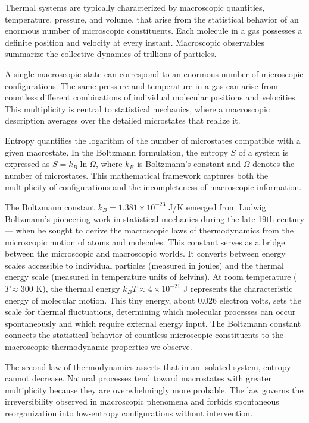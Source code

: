 Thermal systems are typically characterized by macroscopic quantities, temperature, pressure, and volume, that arise from the statistical behavior of an enormous number of microscopic constituents. Each molecule in a gas possesses a definite position and velocity at every instant. Macroscopic observables summarize the collective dynamics of trillions of particles.

A single macroscopic state can correspond to an enormous number of microscopic configurations. The same pressure and temperature in a gas can arise from countless different combinations of individual molecular positions and velocities. This multiplicity is central to statistical mechanics, where a macroscopic description averages over the detailed microstates that realize it.

Entropy quantifies the logarithm of the number of microstates compatible with a given macrostate. In the Boltzmann formulation, the entropy $S$ of a system is expressed as $S = k_B \ln \Omega$, where $k_B$ is Boltzmann's constant and $\Omega$ denotes the number of microstates. This mathematical framework captures both the multiplicity of configurations and the incompleteness of macroscopic information.

The Boltzmann constant $k_B = 1.381 \times 10^{-23}$ J/K emerged from Ludwig Boltzmann's pioneering work in statistical mechanics during the late 19th century — when he sought to derive the macroscopic laws of thermodynamics from the microscopic motion of atoms and molecules. This constant serves as a bridge between the microscopic and macroscopic worlds. It converts between energy scales accessible to individual particles (measured in joules) and the thermal energy scale (measured in temperature units of kelvins). At room temperature ($T \approx 300$ K), the thermal energy $k_B T \approx 4 \times 10^{-21}$ J represents the characteristic energy of molecular motion. This tiny energy, about $0.026$ electron volts, sets the scale for thermal fluctuations, determining which molecular processes can occur spontaneously and which require external energy input. The Boltzmann constant connects the statistical behavior of countless microscopic constituents to the macroscopic thermodynamic properties we observe.

The second law of thermodynamics asserts that in an isolated system, entropy cannot decrease. Natural processes tend toward macrostates with greater multiplicity because they are overwhelmingly more probable. The law governs the irreversibility observed in macroscopic phenomena and forbids spontaneous reorganization into low-entropy configurations without intervention.


